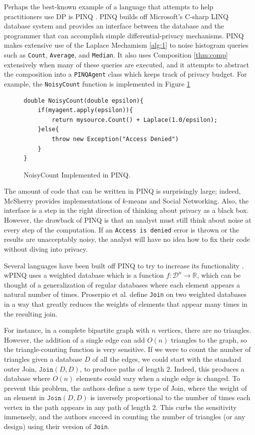 \documentclass[11pt]{article}
\begin{document}
Perhaps the best-known example of a language that attempts to help practitioners use DP is PINQ \cite{McSherry:2010}. PINQ builds off Microsoft's C-sharp LINQ database system and provides an interface between the database and the programmer that can accomplish simple differential-privacy mechanisms. PINQ makes extensive use of the Laplace Mechamism \ref{alg:1} to noise histogram queries such as \texttt{Count}, \texttt{Average}, and \texttt{Median}. It also uses Composition \ref{thm:comp} extensively when many of these queries are executed, and it attempts to abstract the composition into a \texttt{PINQAgent} class which keeps track of privacy budget. For example, the \texttt{NoisyCount} function is implemented in Figure \ref{fig:PINQNoisyCount}
\begin{figure}
\begin{verbatim}
double NoisyCount(double epsilon){
    if(myagent.apply(epsilon)){
        return mysource.Count() + Laplace(1.0/epsilon);
    }else{
        throw new Exception("Access Denied")
    }
}
\end{verbatim}
\caption{NoisyCount Implemented in PINQ.}
\label{fig:PINQNoisyCount}
\end{figure}
The amount of code that can be written in PINQ is surprisingly large; indeed, McSherry provides implementations of $k$-means and Social Networking. Also, the interface is a step in the right direction of thinking about privacy as a black box. However, the drawback of PINQ is that an analyst must still think about noise at every step of the computation. If an \texttt{Access is denied} error is thrown or the results are unacceptably noisy, the analyst will have no idea how to fix their code without diving into privacy.

Several languages have been built off PINQ to try to increase its functionality \cite{Proserpio:2014} \cite{Johnson:2017}. wPINQ \cite{Proserpio:2014} uses a weighted database which is a function $f : \mathcal{D}^n \rightarrow \mathbb{R}$, which can be thought of a generalization of regular databases where each element appears a natural number of times. Proserpio et al. define \texttt{Join} on two weighted databases in a way that greatly reduces the weights of elements that appear many times in the resulting join.

For instance, in a complete bipartite graph with $n$ vertices, there are no triangles. However, the addition of a single edge can add $O(n)$ triangles to the graph, so the triangle-counting function is very sensitive. If we were to count the number of triangles given a database $D$ of all the edges, we could start with the standard outer Join, $\texttt{Join}(D, D)$, to produce paths of length 2. Indeed, this produces a database where $O(n)$ elements could vary when a single edge is changed. To prevent this problem, the authors define a new type of Join, where the weight of an element in $\texttt{Join}(D, D)$ is inversely proportional to the number of times each vertex in the path appears in any path of length 2. This curbs the sensitivity immensely, and the authors succeed in counting the number of triangles (or any design) using their version of \texttt{Join}.
\end{document}
